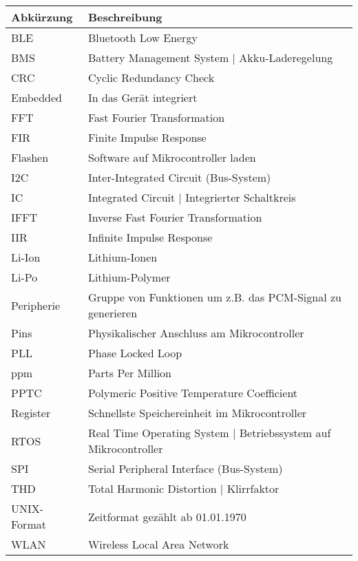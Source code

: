 ﻿\begin{table}[H]
    \centering
    \begin{tabular}{|l|l|}
    \hline
        \textbf{Abkürzung} & \textbf{Beschreibung} \\ \hline
        BLE & Bluetooth Low Energy \\ \hline
        BMS & Battery Management System $\vert$ Akku-Laderegelung \\ \hline
        CRC & Cyclic Redundancy Check \\ \hline
        Embedded & In das Gerät integriert \\ \hline
        FFT & Fast Fourier Transformation \\ \hline
        FIR & Finite Impulse Response \\ \hline
        Flashen & Software auf Mikrocontroller laden \\ \hline
        I2C & Inter-Integrated Circuit (Bus-System) \\ \hline
        IC & Integrated Circuit $\vert$ Integrierter Schaltkreis \\ \hline
        IFFT & Inverse Fast Fourier Transformation \\ \hline
        IIR & Infinite Impulse Response \\ \hline
        Li-Ion & Lithium-Ionen \\ \hline
        Li-Po & Lithium-Polymer \\ \hline
        Peripherie & Gruppe von Funktionen um z.B. das PCM-Signal zu generieren \\ \hline
        Pins & Physikalischer Anschluss am Mikrocontroller \\ \hline
        PLL & Phase Locked Loop \\ \hline
        ppm & Parts Per Million \\ \hline
        PPTC & Polymeric Positive Temperature Coefficient \\ \hline
        Register & Schnellste Speichereinheit im Mikrocontroller \\ \hline
        RTOS & Real Time Operating System $\vert$ Betriebssystem auf Mikrocontroller \\ \hline
        SPI & Serial Peripheral Interface (Bus-System) \\ \hline
        THD & Total Harmonic Distortion $\vert$ Klirrfaktor \\ \hline
        UNIX-Format & Zeitformat gezählt ab 01.01.1970 \\ \hline
        WLAN & Wireless Local Area Network \\ \hline
    \end{tabular}
\end{table}